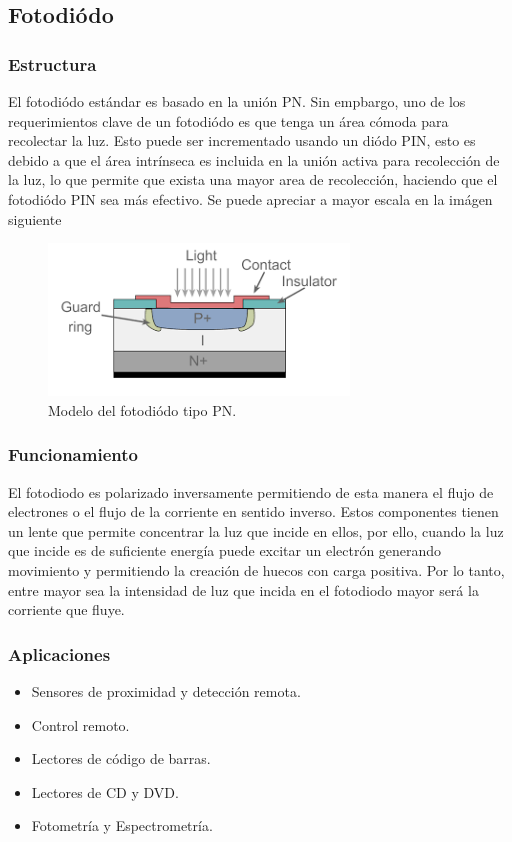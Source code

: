 \documentclass[letterpaper, 12pt]{article}
\begin{document}
\begin{justify}
        \subsection{Fotodiódo}
        \subsubsection{Estructura}
        El fotodiódo estándar es basado en la unión PN. Sin empbargo, uno de los requerimientos clave de un fotodiódo es que tenga un área cómoda para recolectar la luz. Esto puede ser incrementado usando un diódo PIN, esto es debido a que el área intrínseca es incluida en la unión activa para recolección de la luz,
        lo que permite que exista una mayor area de recolección, haciendo que el fotodiódo PIN sea más efectivo. Se puede apreciar a mayor escala en la imágen siguiente
        \begin{figure}[H]
            \centering
            \includegraphics[width=8cm]{fdiodo.png}
            \caption{Modelo del fotodiódo tipo PN.}
            \label{fig:fdiodo}
        \end{figure}
        \subsubsection{Funcionamiento}
        El fotodiodo es polarizado inversamente permitiendo de esta manera el flujo de electrones o el flujo de la corriente en sentido inverso. Estos componentes tienen un lente que permite concentrar la luz que incide en ellos, por ello,
        cuando la luz que incide es de suficiente energía puede excitar un electrón generando movimiento y permitiendo la creación de huecos con carga positiva. Por lo tanto, entre mayor sea la intensidad de luz que incida en el fotodiodo mayor será
        la corriente que fluye.
        \subsubsection{Aplicaciones}
        \begin{itemize}
            \item Sensores de proximidad y detección remota.
            \item Control remoto.
            \item Lectores de código de barras.
            \item Lectores de CD y DVD.
            \item Fotometría y Espectrometría.
        \end{itemize}

\end{justify}
\end{document}
